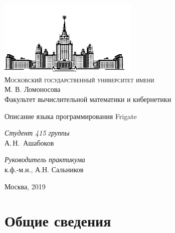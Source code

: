 \documentclass[a4paper, 12pt]{article}
\begin{document}
	
	\thispagestyle{empty}
	\lstset{language=C++}
	
	\begin{center}
		\vspace{-3cm}
		\includegraphics[width=0.5\textwidth]{msu.png}\\
		{\scshape Московский государственный университет имени}\\
		М. В. Ломоносова\\
		Факультет вычислительной математики и кибернетики\\

		
		\vfill
		
		
		\vspace{1cm}
		
		{\LARGE Описание языка программирования Frigate}
	\end{center}
	
	\vspace{1cm}
	
	\begin{flushright}
		\large
		\textit{Студент 415 группы}\\
		А.\,Н.~Ашабоков
		
		\vspace{5mm}
		
		\textit{Руководитель практикума}\\
		к.ф.-м.н., А.Н. Сальников 
	\end{flushright}
	
	\vfill
	
	\begin{center}
		Москва, 2019
	\end{center}
	
	\newpage
	\setcounter{tocdepth}{1}
	\tableofcontents
	
	\newpage
	\normalsize
	
	\section{Общие сведения}
	
\end{document}
